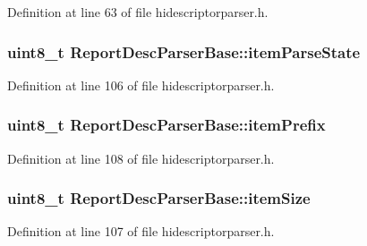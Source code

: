 \-Definition at line 63 of file hidescriptorparser.\-h.

\hypertarget{class_report_desc_parser_base_adfc790524e25a7ad715b1e9adff54a25}{
\subsubsection[{item\-Parse\-State}]{\setlength{\rightskip}{0pt plus 5cm}uint8\-\_\-t {\bf \-Report\-Desc\-Parser\-Base\-::item\-Parse\-State}}}\label{class_report_desc_parser_base_adfc790524e25a7ad715b1e9adff54a25}


\-Definition at line 106 of file hidescriptorparser.\-h.

\hypertarget{class_report_desc_parser_base_a70693c641100c952022ec5c160de1a8d}{
\subsubsection[{item\-Prefix}]{\setlength{\rightskip}{0pt plus 5cm}uint8\-\_\-t {\bf \-Report\-Desc\-Parser\-Base\-::item\-Prefix}}}\label{class_report_desc_parser_base_a70693c641100c952022ec5c160de1a8d}


\-Definition at line 108 of file hidescriptorparser.\-h.

\hypertarget{class_report_desc_parser_base_a4f0da61c408fc42e373b6cc03cd97fab}{
\subsubsection[{item\-Size}]{\setlength{\rightskip}{0pt plus 5cm}uint8\-\_\-t {\bf \-Report\-Desc\-Parser\-Base\-::item\-Size}}}\label{class_report_desc_parser_base_a4f0da61c408fc42e373b6cc03cd97fab}


\-Definition at line 107 of file hidescriptorparser.\-h.


